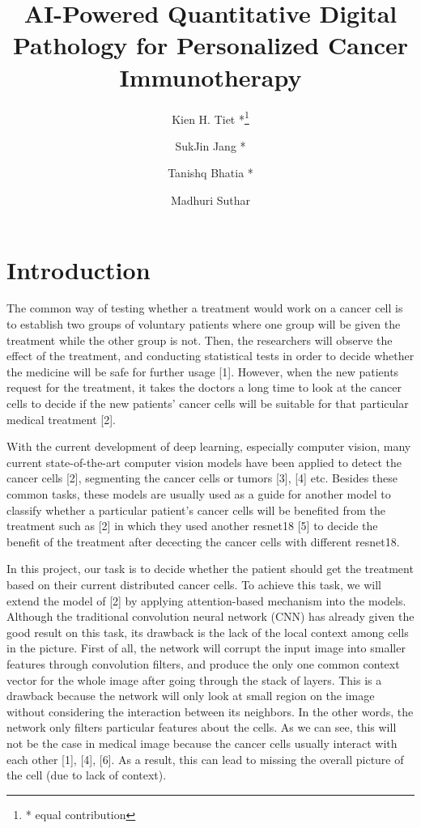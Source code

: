 \documentclass[letterpaper, 11 pt, journal]{ieeeconf}
\title{\LARGE \bf AI-Powered Quantitative Digital Pathology for Personalized Cancer Immunotherapy}
\author[1]{Kien H. Tiet *\thanks{* equal contribution}}
\author[1]{SukJin Jang *}
\author[1]{Tanishq Bhatia *}
\author[1]{Madhuri Suthar}
\affil[1]{University of California, Los Angeles}
\begin{document}
	
	\maketitle
	\thispagestyle{empty}
	\pagestyle{empty}

	\section{Introduction}

	The common way of testing whether a treatment would work on a cancer cell is to establish two groups of voluntary patients where one group 
	will be given the treatment while the other group is not. Then, the researchers will observe the effect of the treatment, and conducting 
	statistical tests in order to decide whether the medicine will be safe for further usage [1]. However, when the new patients request for
	the treatment, it takes the doctors a long time to look at the cancer cells to decide if the new patients' cancer cells will be suitable for 
	that particular medical treatment [2].

	With the current development of deep learning, especially computer vision, many current state-of-the-art computer vision models have been applied to 
	detect the cancer cells [2], segmenting the cancer cells or tumors [3], [4] etc. Besides these common tasks, these models are usually used as a guide 
	for another model to classify whether a particular patient's cancer cells will be benefited from the treatment such as [2] in which they used 
	another resnet18 [5] to decide the benefit of the treatment after dececting the cancer cells with different resnet18.
		
	In this project, our task is to decide whether the patient should get the treatment based on their current distributed cancer cells. To achieve this
	task, we will extend the model of [2] by applying attention-based mechanism into the models. Although the traditional convolution neural network (CNN)
	has already given the good result on this task, its drawback is the lack of the local context among cells in the picture. First of all, 
	the network will corrupt the input image into smaller features through convolution filters, and produce the only one common context vector for the whole 
	image after going through the stack of layers. This is a drawback because the network will only look at small region on the image without considering 
	the interaction between its neighbors. In the other words, the network only filters particular features about the cells. As we can see, this will not 
	be the case in medical image because the cancer cells usually interact with each other [1], [4], [6]. 
	As a result, this can lead to missing the overall picture of the cell (due to lack of context). 
	
\end{document}
